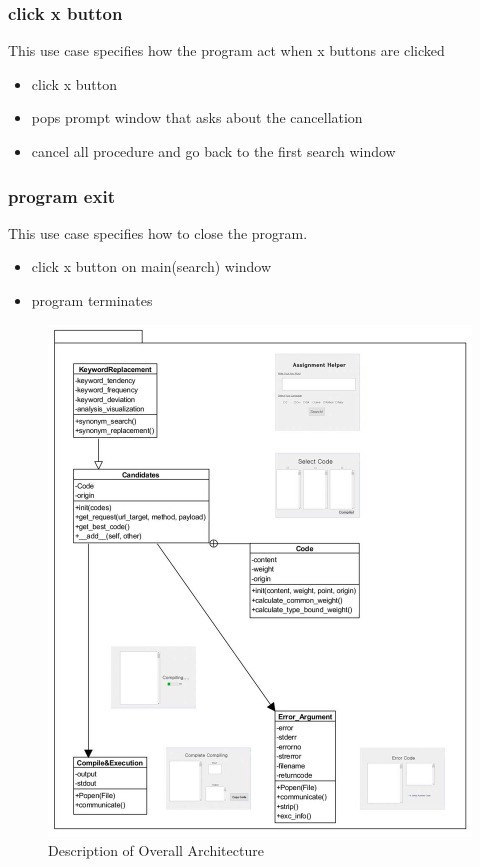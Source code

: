 \documentclass[conference]{IEEEtran}
\begin{document}
\subsubsection{click x button}
This use case specifies how the program act when x buttons are clicked
\begin{itemize}
  \item click x button
  \item pops prompt window that asks about the cancellation
  \item cancel all procedure and go back to the first search window
\end{itemize}
\textit{}



\subsubsection{program exit}
This use case specifies how to close the program.
\begin{itemize}
  \item click x button on main(search) window
  \item program terminates
\end{itemize}
\textit{}




\begin{figure}
\centering
\includegraphics[width=1\textwidth]{./figures/overall_arch.jpg}
\caption{Description of Overall Architecture}
\label{overall}
\end{figure}
\end{document}
